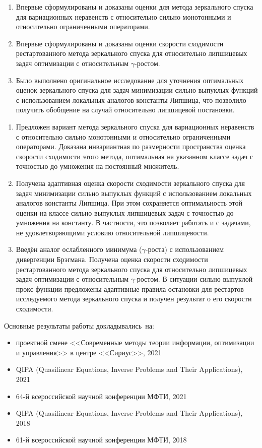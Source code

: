 {\novelty}
\begin{enumerate}[beginpenalty=10000] %
  \item Впервые сформулированы и доказаны оценки для метода зеркального спуска для вариационных неравенств с относительно сильно монотонными и относительно ограниченными операторами.
  \item Впервые сформулированы и доказаны оценки скорости сходимости рестартованного метода зеркального спуска для относительно липшицевых задач оптимизации с относительным $\gamma$-ростом.
  \item Было выполнено оригинальное исследование для уточнения оптимальных оценок зеркального спуска для задач минимизации сильно выпуклых функций с использованием локальных аналогов константы Липшица, что позволило получить обобщение на случай относительно липшицевой постановки. 
\end{enumerate}

{}
\begin{enumerate}[beginpenalty=10000] %
  \item Предложен вариант метода зеркального спуска для вариационных неравенств с относительно сильно монотонными и относительно ограниченными операторами. Доказана инвариантная по размерности пространства оценка скорости сходимости этого метода, оптимальная на указанном классе задач с точностью до умножения на постоянный множитель.
  \item Получена адаптивная оценка скорости сходимости зеркального спуска для задач минимизации сильно выпуклых функций с использованием локальных аналогов константы Липшица. При этом сохраняется оптимальность этой оценки на классе сильно выпуклых липшицевых задач с точностью до умножения на константу. В частности, это позволяет работать и с задачами, не удовлетворяющими условию относительной липшицевости.
  \item Введён аналог ослабленного минимума ($\gamma$-роста) с использованием дивергенции Брэгмана. Получена оценка скорости сходимости рестартованного метода зеркального спуска для относительно липшицевых задач оптимизации с относительным $\gamma$-ростом. В ситуации сильно выпуклой прокс-функции предложены адаптивные правила остановки для рестартов исследуемого метода зеркального спуска и получен результат о его скорости сходимости.
\end{enumerate}

{\probation}
Основные результаты работы докладывались~на:
\begin{itemize}
    \item проектной смене <<Современные методы теории информации, оптимизации и управления>> в центре <<Сириус>>, 2021
    \item QIPA (Quasilinear Equations, Inverse Problems and Their Applications), 2021
    \item 64-й всероссийской научной конференции МФТИ, 2021
    \item QIPA (Quasilinear Equations, Inverse Problems and Their Applications), 2018
    \item 61-й всероссийской научной конференции МФТИ, 2018
\end{itemize}

